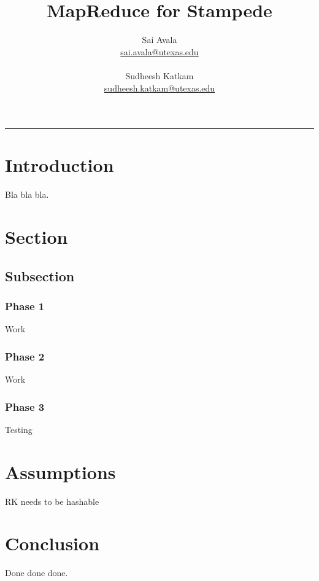 \documentclass[11pt]{article}
\title{MapReduce for Stampede}
\author{
  Sai Avala\\ 
  \href{mailto:sai.avala@utexas.edu}
          {sai.avala@utexas.edu}  \\ \\
  Sudheesh Katkam \\
  \href{mailto:sudheesh.katkam@utexas.edu}
          {sudheesh.katkam@utexas.edu}  }
\begin{document}
\maketitle
\newpage
\rule{6.0in}{.015in}
\tableofcontents
\newpage

\section{Introduction}
Bla bla bla.


\section{Section}
\subsection{Subsection}
\subsubsection*{Phase 1}
Work 
\subsubsection*{Phase 2}
Work
\subsubsection*{Phase 3}
Testing

\section{Assumptions}
RK needs to be hashable

\section{Conclusion}
Done done done.
\end{document}
